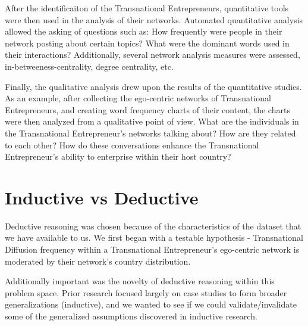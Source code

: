 After the identificaiton of the Transnational Entrepreneurs,
quantitative tools were then used in the analysis of their
networks. Automated quantitative analysis allowed the asking of
questions such as: How frequently were people in their network posting
about certain topics?  What were the dominant words used in their
interactions? Additionally, several network analysis measures were
assessed, in-betweeness-centrality, degree centrality, etc.

Finally, the qualitative analysis drew upon the results of the
quantitative studies. As an example, after collecting the ego-centric
networks of Transnational Entrepreneurs, and creating word frequency
charts of their content, the charts were then analyzed from a
qualitative point of view. What are the individuals in the
Transnational Entrepreneur's networks talking about? How are they
related to each other? How do these conversations enhance the
Transnational Entrepreneur's ability to enterprise within their host
country?

\section{Inductive vs Deductive}
Deductive reasoning was chosen because of the characteristics of the
dataset that we have available to us. We first began with a testable
hypothesis - Transnational Diffusion frequency within a Transnational
Entrepreneur's ego-centric network is moderated by their network's
country distribution.

Additionally important was the novelty of deductive reasoning within
this problem space. Prior research focused largely on case studies to
form broader generalizations (inductive), and we wanted to see if we
could validate/invalidate some of the generalized assumptions
discovered in inductive research.
